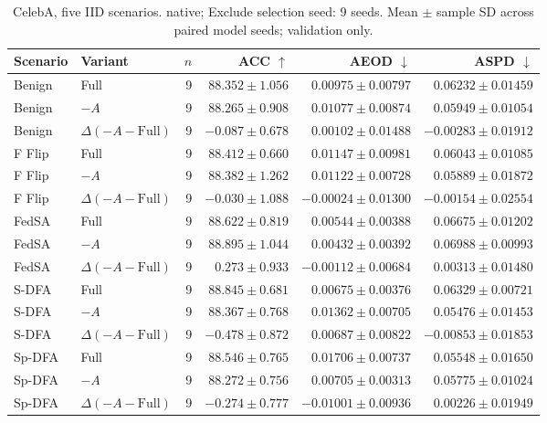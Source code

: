 \begin{table}[t]
\centering
\small
\caption{CelebA, five IID scenarios. native; Exclude selection seed: 9 seeds. Mean $\pm$ sample SD across paired model seeds; validation only.}
\begin{tabular}{llrrrr}
\toprule
Scenario & Variant & $n$ & ACC $\uparrow$ & AEOD $\downarrow$ & ASPD $\downarrow$ \\
\midrule
Benign & Full & 9 & $88.352 \pm 1.056$ & $0.00975 \pm 0.00797$ & $0.06232 \pm 0.01459$ \\
Benign & $-A$ & 9 & $88.265 \pm 0.908$ & $0.01077 \pm 0.00874$ & $0.05949 \pm 0.01054$ \\
Benign & $\Delta(-A-\mathrm{Full})$ & 9 & $-0.087 \pm 0.678$ & $0.00102 \pm 0.01488$ & $-0.00283 \pm 0.01912$ \\
F Flip & Full & 9 & $88.412 \pm 0.660$ & $0.01147 \pm 0.00981$ & $0.06043 \pm 0.01085$ \\
F Flip & $-A$ & 9 & $88.382 \pm 1.262$ & $0.01122 \pm 0.00728$ & $0.05889 \pm 0.01872$ \\
F Flip & $\Delta(-A-\mathrm{Full})$ & 9 & $-0.030 \pm 1.088$ & $-0.00024 \pm 0.01300$ & $-0.00154 \pm 0.02554$ \\
FedSA & Full & 9 & $88.622 \pm 0.819$ & $0.00544 \pm 0.00388$ & $0.06675 \pm 0.01202$ \\
FedSA & $-A$ & 9 & $88.895 \pm 1.044$ & $0.00432 \pm 0.00392$ & $0.06988 \pm 0.00993$ \\
FedSA & $\Delta(-A-\mathrm{Full})$ & 9 & $0.273 \pm 0.933$ & $-0.00112 \pm 0.00684$ & $0.00313 \pm 0.01480$ \\
S-DFA & Full & 9 & $88.845 \pm 0.681$ & $0.00675 \pm 0.00376$ & $0.06329 \pm 0.00721$ \\
S-DFA & $-A$ & 9 & $88.367 \pm 0.768$ & $0.01362 \pm 0.00705$ & $0.05476 \pm 0.01453$ \\
S-DFA & $\Delta(-A-\mathrm{Full})$ & 9 & $-0.478 \pm 0.872$ & $0.00687 \pm 0.00822$ & $-0.00853 \pm 0.01853$ \\
Sp-DFA & Full & 9 & $88.546 \pm 0.765$ & $0.01706 \pm 0.00737$ & $0.05548 \pm 0.01650$ \\
Sp-DFA & $-A$ & 9 & $88.272 \pm 0.756$ & $0.00705 \pm 0.00313$ & $0.05775 \pm 0.01024$ \\
Sp-DFA & $\Delta(-A-\mathrm{Full})$ & 9 & $-0.274 \pm 0.777$ & $-0.01001 \pm 0.00936$ & $0.00226 \pm 0.01949$ \\
\bottomrule
\end{tabular}
\end{table}


